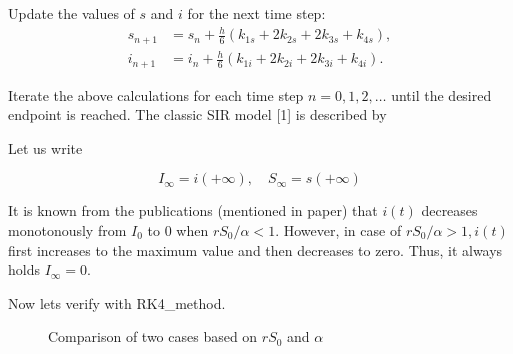\documentclass[10pt]{article}
\begin{document}
Update the values of \(s\) and \(i\) for the next time step:
\begin{align*}
s_{n+1} &= s_n + \frac{h}{6} (k_{1s} + 2k_{2s} + 2k_{3s} + k_{4s}), \\
i_{n+1} &= i_n + \frac{h}{6} (k_{1i} + 2k_{2i} + 2k_{3i} + k_{4i}).
\end{align*}

Iterate the above calculations for each time step \(n = 0, 1, 2, \dots\) until the desired endpoint is reached.
  The classic SIR model [1] is described by




Let us write

$$
I_{\infty}=i(+\infty), \quad S_{\infty}=s(+\infty)
$$

It is known from the  publications (mentioned in paper)  that $i(t)$ decreases monotonously from $I_{0}$ to 0 when $r S_{0} / \alpha<1$. However, in case of $r S_{0} / \alpha>1, i(t)$ first increases to the maximum value and then decreases to zero. Thus, it always holds $I_{\infty}=0$.
\newline

Now lets verify with RK4\_method.


\begin{figure}[!htbp]
  \centering
  \hfill
  \caption{Comparison of two cases based on \(rS_0\) and \(\alpha\) }
\end{figure}
   
\end{document}
